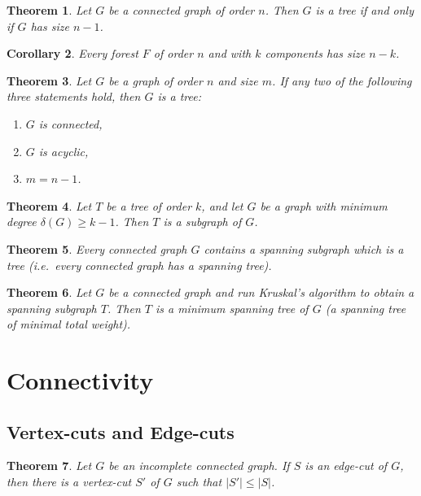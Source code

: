 \documentclass{article}
\newtheorem{theorem}{Theorem}[section]
\newtheorem{corollary}[theorem]{Corollary}
\begin{document}
\begin{theorem}
Let $G$ be a connected graph of order $n$. Then $G$ is a tree if and only if $G$ has size $n - 1$.
\end{theorem}

\begin{corollary}
Every forest $F$ of order $n$ and with $k$ components has size $n - k$.
\end{corollary}

\begin{theorem}
Let $G$ be a graph of order $n$ and size $m$.  If any two of the following three statements hold, then $G$ is a tree:
\begin{enumerate}
\item $G$ is connected,
\item $G$ is acyclic,
\item $m = n - 1$.
\end{enumerate}
\end{theorem}

\begin{theorem}
Let $T$ be a tree of order $k$, and let $G$ be a graph with minimum degree $\delta(G)\ge k-1$. Then $T$ is a subgraph of $G$.
\end{theorem}

\begin{theorem}
Every connected graph $G$ contains a spanning subgraph which is a tree (i.e.\ every connected graph has a spanning tree).
\end{theorem}

\begin{theorem}
Let $G$ be a connected graph and run Kruskal's algorithm to obtain a spanning subgraph $T$. Then $T$ is a minimum spanning tree of $G$ (a spanning tree of minimal total weight).
\end{theorem}

\section{Connectivity}

\subsection{Vertex-cuts and Edge-cuts}
\begin{theorem}
Let $G$ be an incomplete connected graph. If $S$ is an edge-cut of $G$, then there is a vertex-cut $S'$ of $G$ such that $|S'|\le |S|$.
\end{theorem}
\end{document}
